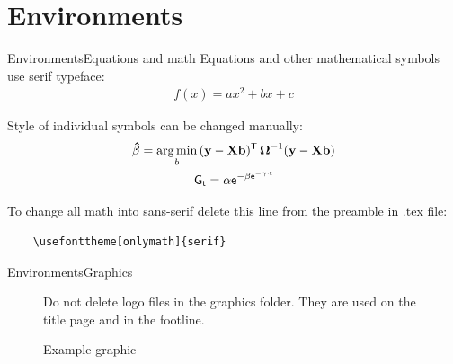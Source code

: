 \documentclass[aspectratio=169, 11pt]{beamer}
\begin{document}
\section{Environments}
\begin{frame}[fragile]{Environments}{Equations and math}   %
Equations and other mathematical symbols use serif typeface:
\begin{gather*}
f(x)= a x^2 + b x + c
\end{gather*}

Style of individual symbols can be changed manually:
\begin{gather*}
\mathbf{\hat{\beta}} = \underset{b}{\rm arg\,min}\,(\mathbf{y}- \mathbf{X} \mathbf{b})^{\mathsf{T}}\,\boldsymbol{\Omega}^{-1}(\mathbf{y}- \mathbf{X} \mathbf{b}) \\
\mathsf{    G_t = \alpha e^{-\beta e^{-\gamma \cdot t}}    }
\end{gather*}

To change all math into sans-serif delete this line from the preamble in .tex file:
	\begin{verbatim}
	\usefonttheme[onlymath]{serif}
	\end{verbatim}
\end{frame}

\begin{frame}{Environments}{Graphics}
\vspace{-12pt}
	\begin{figure}
	\centering
	\caption{Example graphic \label{fig:figure1}}
	\footnotesize
	\flushleft
	Do not delete logo files in the graphics folder. They are used on the title page and in the footline.
	\end{figure}
\end{frame}
\end{document}
